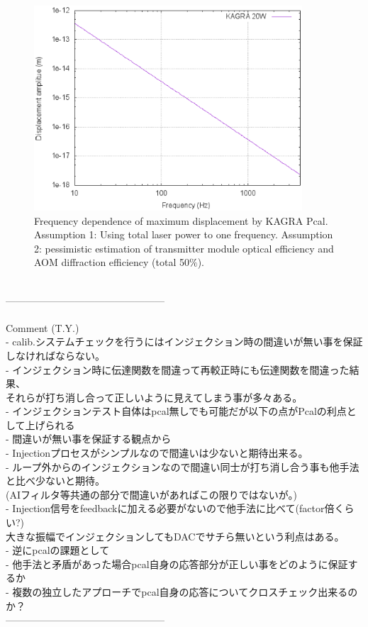 \begin{figure}
\begin{center}
\includegraphics[width=10cm]{Figures/pcal_disp.eps}
\caption{Frequency dependence of maximum displacement by KAGRA Pcal. 
Assumption 1: Using total laser power to one frequency.
Assumption 2: pessimistic estimation of transmitter module optical efficiency and 
AOM diffraction efficiency (total 50$\%$). }
\label{fig:kagra_pcal_displacement} 
\end{center}
\end{figure}

\\------------------------------------------------\\
\\ Comment (T.Y.)
\\   - calib.システムチェックを行うにはインジェクション時の間違いが無い事を保証しなければならない。
\\       - インジェクション時に伝達関数を間違って再較正時にも伝達関数を間違った結果、
\\         それらが打ち消し合って正しいように見えてしまう事が多々ある。
\\   - インジェクションテスト自体はpcal無しでも可能だが以下の点がPcalの利点として上げられる
\\       - 間違いが無い事を保証する観点から
\\           - Injectionプロセスがシンプルなので間違いは少ないと期待出来る。
\\           - ループ外からのインジェクションなので間違い同士が打ち消し合う事も他手法と比べ少ないと期待。
\\             (AIフィルタ等共通の部分で間違いがあればこの限りではないが。)
\\       - Injection信号をfeedbackに加える必要がないので他手法に比べて(factor倍くらい?)
\\         大きな振幅でインジェクションしてもDACでサチら無いという利点はある。
\\   - 逆にpcalの課題として
\\       - 他手法と矛盾があった場合pcal自身の応答部分が正しい事をどのように保証するか
\\           - 複数の独立したアプローチでpcal自身の応答についてクロスチェック出来るのか？
\\------------------------------------------------\\

